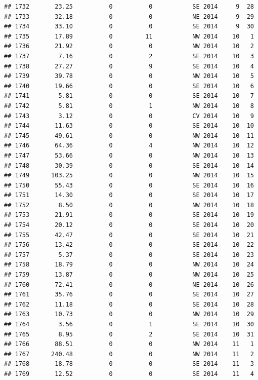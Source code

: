 \documentclass[
]{article}
\begin{document}
\begin{verbatim}
## 1732       23.25          0          0           SE 2014     9  28
## 1733       32.18          0          0           NE 2014     9  29
## 1734       33.10          0          0           SE 2014     9  30
## 1735       17.89          0         11           NW 2014    10   1
## 1736       21.92          0          0           NW 2014    10   2
## 1737        7.16          0          2           SE 2014    10   3
## 1738       27.27          0          9           SE 2014    10   4
## 1739       39.78          0          0           NW 2014    10   5
## 1740       19.66          0          0           SE 2014    10   6
## 1741        5.81          0          0           SE 2014    10   7
## 1742        5.81          0          1           NW 2014    10   8
## 1743        3.12          0          0           CV 2014    10   9
## 1744       11.63          0          0           SE 2014    10  10
## 1745       49.61          0          0           NW 2014    10  11
## 1746       64.36          0          4           NW 2014    10  12
## 1747       53.66          0          0           NW 2014    10  13
## 1748       30.39          0          0           SE 2014    10  14
## 1749      103.25          0          0           NW 2014    10  15
## 1750       55.43          0          0           SE 2014    10  16
## 1751       14.30          0          0           SE 2014    10  17
## 1752        8.50          0          0           NW 2014    10  18
## 1753       21.91          0          0           SE 2014    10  19
## 1754       20.12          0          0           SE 2014    10  20
## 1755       42.47          0          0           SE 2014    10  21
## 1756       13.42          0          0           SE 2014    10  22
## 1757        5.37          0          0           SE 2014    10  23
## 1758       18.79          0          0           NW 2014    10  24
## 1759       13.87          0          0           NW 2014    10  25
## 1760       72.41          0          0           NE 2014    10  26
## 1761       35.76          0          0           SE 2014    10  27
## 1762       11.18          0          0           SE 2014    10  28
## 1763       10.73          0          0           NW 2014    10  29
## 1764        3.56          0          1           SE 2014    10  30
## 1765        8.95          0          2           SE 2014    10  31
## 1766       88.51          0          0           NW 2014    11   1
## 1767      240.48          0          0           NW 2014    11   2
## 1768       18.78          0          0           SE 2014    11   3
## 1769       12.52          0          0           SE 2014    11   4

\end{verbatim}
\end{document}
